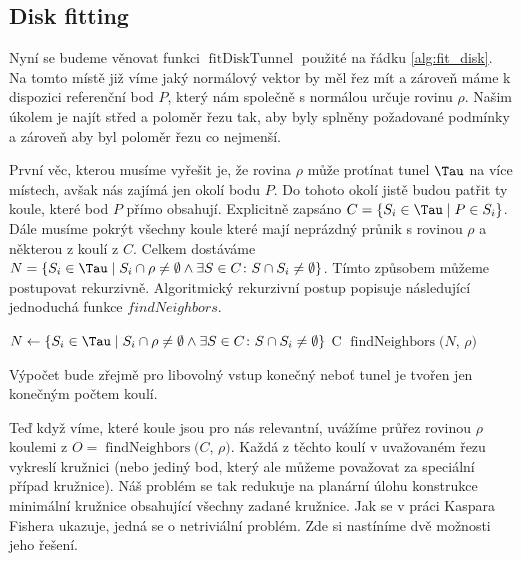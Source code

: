 \subsection{Disk fitting} \label{subsec:disk_fit}
Nyní se budeme věnovat funkci $ \operatorname{fitDiskTunnel} $ použité na řádku
\ref{alg:fit_disk}. Na tomto místě již víme jaký normálový vektor by měl řez mít a
zároveň máme k dispozici referenční bod $ P $, který nám společně s normálou
určuje rovinu $ \rho $. Našim úkolem je najít střed a poloměr řezu tak, aby
byly splněny požadované podmínky a zároveň aby byl poloměr řezu co nejmenší.

První věc, kterou musíme vyřešit je, že rovina $ \rho $ může protínat tunel $ \Tau $
na více místech, avšak nás zajímá jen okolí bodu $ P $. Do tohoto okolí jistě
budou patřit ty koule, které bod $ P $ přímo obsahují. Explicitně
zapsáno $ C = \{S_i \in \Tau \mid P \in S_i \} $. Dále musíme pokrýt všechny
koule které mají neprázdný průnik s rovinou $ \rho $ a některou z koulí z $ C $.
Celkem dostáváme
$ N = \{ S_i \in \Tau \mid S_i \cap \rho \neq \emptyset \wedge \exists S \in C \colon S \cap S_i \neq \emptyset  \}$.
Tímto způsobem můžeme postupovat rekurzivně. Algoritmický rekurzivní postup
popisuje následující jednoduchá funkce $ findNeighbors $.

\begin{algorithmic}[1]
\label{alg:findNeighbors}

    \State $ N \gets \{ S_i \in \Tau \mid S_i \cap \rho \neq \emptyset
        \wedge \exists S \in C \colon S \cap S_i \neq \emptyset \} $
        \State \Return C
    \Else
        \State \Return $\operatorname{findNeighbors}(N$, $\rho)$
    \EndIf
\EndFunction

\end{algorithmic}

Výpočet bude zřejmě pro libovolný vstup konečný neboť tunel je tvořen jen konečným
počtem koulí.

Teď když víme, které koule jsou pro nás relevantní, uvážíme průřez rovinou
$ \rho $ koulemi z $ O = \operatorname{findNeighbors}(C$, $\rho)$.
Každá z těchto koulí v uvažovaném řezu vykreslí
kružnici (nebo jediný bod, který ale můžeme považovat za speciální případ kružnice).
Náš problém se tak redukuje na planární úlohu konstrukce minimální kružnice obsahující
všechny zadané kružnice. Jak se v práci Kaspara Fishera \cite{FisherBalls} ukazuje,
jedná se o netriviální problém. Zde si nastíníme dvě možnosti jeho řešení.

